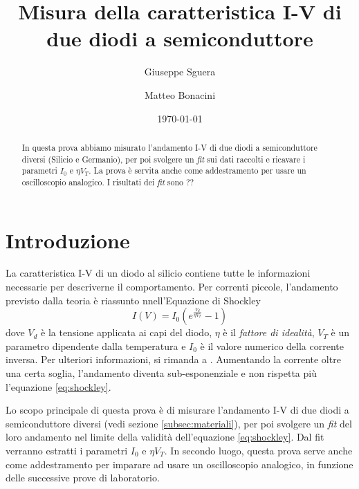 \documentclass[11pt, a4paper, twoside]{article}
\author{Giuseppe Sguera \\ \getenv{MAT1} \and Matteo Bonacini \\ \getenv{MAT2}}
\date{\today}
\title{Misura della caratteristica I-V di due diodi a semiconduttore}
\begin{document}

    \maketitle

    \begin{abstract}\label{sec:abstract}
      In questa prova abbiamo misurato l'andamento I-V di due diodi a semiconduttore diversi (Silicio e Germanio), per poi svolgere un \emph{fit}
      sui dati raccolti e ricavare i parametri $I_0$ e $\eta V_T$. La prova è servita anche come addestramento per usare
      un oscilloscopio analogico. I risultati dei \emph{fit} sono ?? %
    \end{abstract}

\section{Introduzione}\label{sec:scopo}
  La caratteristica I-V di un diodo al silicio contiene tutte le informazioni necessarie per descriverne il comportamento.
  Per correnti piccole, l'andamento previsto dalla teoria è riassunto nnell'Equazione di Shockley
  \begin{equation}
    I(V) = I_0 \left(
      e^{
        \frac {V_d} {\eta V_T}
      } - 1
    \right)
    \label{eq:shockley}
  \end{equation}
  dove $V_d$ è la tensione applicata ai capi del diodo, $\eta$ è il \emph{fattore di idealità}, $V_T$ è un parametro dipendente dalla
  temperatura e $I_0$ è il valore numerico della corrente inversa. Per ulteriori informazioni, si rimanda a \cite{halkias2001integrated}.
  Aumentando la corrente oltre una certa soglia, l'andamento diventa sub-esponenziale e non rispetta più l'equazione \eqref{eq:shockley}.

  Lo scopo principale di questa prova è di misurare l'andamento I-V di due diodi a semiconduttore diversi (vedi sezione \ref{subsec:materiali}), per poi svolgere un
  \emph{fit} del loro andamento nel limite della validità dell'equazione \eqref{eq:shockley}. Dal fit verranno estratti i parametri $I_0$ e $\eta V_T$.
  In secondo luogo, questa prova serve anche come addestramento per imparare ad usare un oscilloscopio analogico, in funzione delle successive
  prove di laboratorio.
\end{document}
